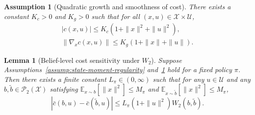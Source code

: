 \documentclass[10pt,a4paper]{amsart}
\newtheorem{assumption}{Assumption}
\newtheorem{lemma}{Lemma}
\begin{document}
\begin{assumption}[Quadratic growth and smoothness of cost]
\label{assump:cost-regularity}
There exists a constant $K_c>0$ and $K_g>0$ such that for all $(x,u)\in\mathcal{X}\times\mathcal{U}$,
\begin{align}
|c(x,u)| \le K_c\left(1+\|x\|^2+\|u\|^2\right), \\
\|\nabla_x c(x,u)\| \le K_g\left(1+\|x\|+\|u\|\right).
\end{align}
\end{assumption}

\begin{lemma}[Belief-level cost sensitivity under $W_2$]
\label{lem:cost-sensitivity}
Suppose Assumptions~\ref{assump:state-moment-regularity} and~\ref{assump:cost-regularity} hold for a fixed policy $\pi$.
Then there exists a finite constant $L_\pi\in (0, \infty)$ such that for any $u\in\mathcal{U}$ and any $b,\tilde b\in\mathcal{P}_2(\mathcal{X})$ satisfying
$\mathbb{E}_{x\sim b}[\|x\|^2] \le M_\pi$ and
$\mathbb{E}_{x\sim \tilde b}[\|x\|^2] \le M_\pi$,
\begin{equation}
\left|\bar c(b,u)-\bar c(\tilde b,u)\right|
\le
L_\pi\left(1+\|u\|^2\right)W_2(b,\tilde b).
\end{equation}
\end{lemma}
\end{document}
